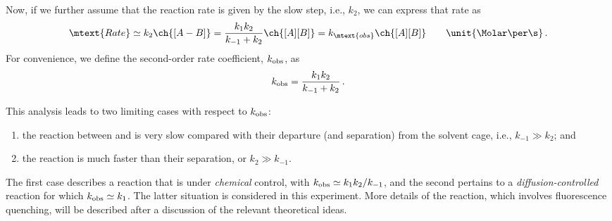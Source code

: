 \documentclass[nobib,nofonts,nols,nohyper]{tufte-handout}
\begin{document}
Now, if we further assume that the reaction rate is given by the slow step, i.e., \( k_2 \)\ch{[A-B]}, we can express that rate as
\[
	\mtext{Rate} \simeq k_2 \ch{[A-B]} = \frac{k_1 k_2}{k_{-1} + k_2} \ch{[A][B]} = k_\mtext{obs}\ch{[A][B]} \qquad \unit{\Molar \per \s} \, .
\]
For convenience, we define the second-order rate coefficient, \( k_\textup{obs} \), as 
\begin{equation}
	k_\textup{obs} = \frac{k_1 k_2}{k_{-1} + k_2} \, .
	\label{eq:k_obs}
\end{equation}

This analysis leads to two limiting cases with respect to \( k_\textup{obs} \): 
\begin{enumerate}
	\item the reaction between  and  is very slow compared with their departure (and separation) from the solvent cage, i.e., \( k_{-1} \gg k_2 \); and 
	\item the  reaction is much faster than their separation, or \( k_2 \gg k_{-1} \). 
\end{enumerate}
The first case describes a reaction that is under \emph{chemical} control, with \( k_\textup{obs} \simeq k_1 k_2 / k_{-1} \), and the second pertains to a \emph{diffusion-controlled} reaction for which \( k_\textup{obs} \simeq k_1 \). 
The latter situation is considered in this experiment. More details of the reaction, which involves fluorescence quenching, will be described after a discussion of the relevant theoretical ideas. 
\end{document}
